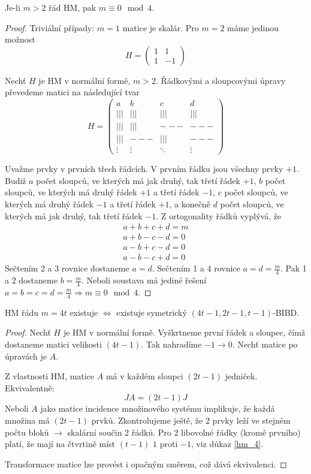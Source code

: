 \begin{theorem}\label{hm_4}
    Je-li $m>2$ řád HM, pak $m\equiv 0\mod 4$.
\end{theorem}
\begin{proof}
	Triviální případy: $m = 1$ matice je skalár.
	Pro $m = 2$ máme jedinou možnost
	\[ H = \begin{pmatrix} 1 & 1\\ 1 & -1 \end{pmatrix} \]

	Nechť $H$ je HM v normální formě, $m > 2$.
	Řádkovými a sloupcovými úpravy převedeme matici na následující tvar
	\[ H = \begin{pmatrix}
		a & b & c & d \\
		||| & ||| & ||| & ||| \\
		||| & ||| & --- & --- \\
		||| & --- & ||| & --- \\
            	\vdots  & \vdots  & \ddots & \vdots
	      \end{pmatrix}
	\]

	Uvažme prvky v prvních třech řádcích. V prvním řádku jsou všechny prvky $+1$.
	Budiž $a$ počet sloupců, ve kterých má jak druhý, tak třetí řádek $+1$, $b$ počet sloupců, ve kterých má druhý řádek $+1$ a třetí řádek $-1$, $c$
	počet sloupců, ve kterých má druhý řádek $-1$ a třetí řádek $+1$, a konečně $d$ počet sloupců, ve kterých má jak druhý, tak třetí řádek $-1$.
	Z ortogonality řádků vyplývá, že
	\begin{gather*}
		a + b + c + d = m\\
		a + b - c - d = 0\\
		a - b + c - d = 0\\
		a - b - c + d = 0
	\end{gather*}
	Sečtením 2 a 3 rovnice dostaneme $a = d$.
	Sečtením 1 a 4 rovnice $a = d = \frac{m}{4}$.
	Pak 1 a 2 dostaneme $b = \frac{m}{4}$.
	Neboli soustava má jediné řešení $a = b = c = d = \frac{m}{4} \Rightarrow m \equiv 0 \mod4$.
\end{proof}

\begin{theorem}
    HM řádu $m=4t$ existuje $\iff$ existuje symetrický $(4t-1,2t-1,t-1)$-BIBD.
\end{theorem}
\begin{proof}
	Nechť $H$ je HM v normální formě.
	Vyškrtneme první řádek a sloupec, čímž dostaneme matici velikosti $(4t - 1)$.
	Tak nahradíme $-1 \to 0$.
	Nechť matice po úpravách je $A$.

	Z vlastnosti HM, matice $A$ má v každém sloupci $(2t - 1)$ jedniček.
	Ekvivalentně:
	\[ JA = (2t - 1) J \]
	Neboli $A$ jako matice incidence množinového systému implikuje, že každá množina má $(2t - 1)$ prvků.
	Zkontrolujeme ještě, že 2 prvky leží ve stejném počtu bloků $\to$ skalární součin 2 řádků.
	Pro 2 libovolné řádky (kromě prvního) platí, že mají na čtvrtině míst $(t - 1)$ $1$ proti $-1$, viz důkaz \cref{hm_4}.

	Transformace matice lze provést i opačným směrem, což dává ekvivalenci.
\end{proof}

